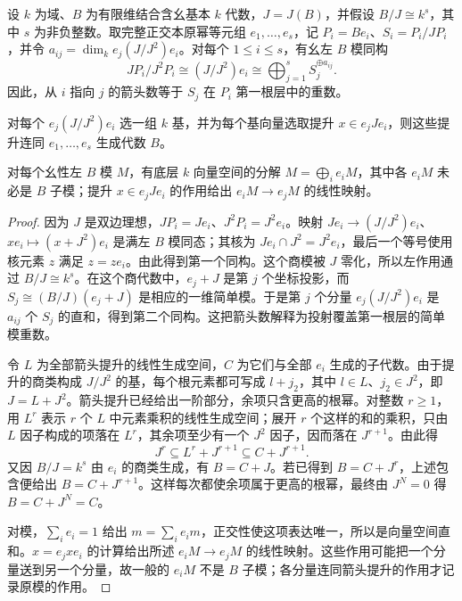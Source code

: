 \begin{proposition}\label{b2:prop:basic-algebra-arrow-generators}
	设 \(k\) 为域、\(B\) 为有限维结合含幺基本 \(k\) 代数，\(J=J(B)\)，并假设 \(B/J\cong k^s\)，其中 \(s\) 为非负整数。取完整正交本原幂等元组 \(e_1,\ldots,e_s\)，记 \(P_i=Be_i\)、\(S_i=P_i/JP_i\)，并令 \(a_{ij}=\dim_k e_j(J/J^2)e_i\)。对每个 \(1\le i\le s\)，有幺左 \(B\) 模同构
	\[
		JP_i/J^2P_i\cong(J/J^2)e_i \cong\bigoplus_{j=1}^s S_j^{\oplus a_{ij}}.
	\]
	因此，从 \(i\) 指向 \(j\) 的箭头数等于 \(S_j\) 在 \(P_i\) 第一根层中的重数。

	对每个 \(e_j(J/J^2)e_i\) 选一组 \(k\) 基，并为每个基向量选取提升 \(x\in e_jJe_i\)，则这些提升连同 \(e_1,\ldots,e_s\) 生成代数 \(B\)。

	对每个幺性左 \(B\) 模 \(M\)，有底层 \(k\) 向量空间的分解 \(M=\bigoplus_i e_iM\)，其中各 \(e_iM\) 未必是 \(B\) 子模；提升 \(x\in e_jJe_i\) 的作用给出 \(e_iM\to e_jM\) 的线性映射。
\end{proposition}
\begin{proof}
	因为 \(J\) 是双边理想，\(JP_i=Je_i\)、\(J^2P_i=J^2e_i\)。映射 \(Je_i\to(J/J^2)e_i\)、\(xe_i\mapsto(x+J^2)e_i\) 是满左 \(B\) 模同态；其核为 \(Je_i\cap J^2=J^2e_i\)，最后一个等号使用核元素 \(z\) 满足 \(z=ze_i\)。由此得到第一个同构。这个商模被 \(J\) 零化，所以左作用通过 \(B/J\cong k^s\)。在这个商代数中，\(e_j+J\) 是第 \(j\) 个坐标投影，而 \(S_j\cong(B/J)(e_j+J)\) 是相应的一维简单模。于是第 \(j\) 个分量 \(e_j(J/J^2)e_i\) 是 \(a_{ij}\) 个 \(S_j\) 的直和，得到第二个同构。这把箭头数解释为投射覆盖第一根层的简单模重数。

	令 \(L\) 为全部箭头提升的线性生成空间，\(C\) 为它们与全部 \(e_i\) 生成的子代数。由于提升的商类构成 \(J/J^2\) 的基，每个根元素都可写成 \(l+j_2\)，其中 \(l\in L\)、\(j_2\in J^2\)，即 \(J=L+J^2\)。箭头提升已经给出一阶部分，余项只含更高的根幂。对整数 \(r\ge1\)，用 \(L^r\) 表示 \(r\) 个 \(L\) 中元素乘积的线性生成空间；展开 \(r\) 个这样的和的乘积，只由 \(L\) 因子构成的项落在 \(L^r\)，其余项至少有一个 \(J^2\) 因子，因而落在 \(J^{r+1}\)。由此得
	\[
		J^r\subseteq L^r+J^{r+1}\subseteq C+J^{r+1}.
	\]
	又因 \(B/J=k^s\) 由 \(e_i\) 的商类生成，有 \(B=C+J\)。若已得到 \(B=C+J^r\)，上述包含便给出 \(B=C+J^{r+1}\)。这样每次都使余项属于更高的根幂，最终由 \(J^N=0\) 得 \(B=C+J^N=C\)。

	对模，\(\sum_i e_i=1\) 给出 \(m=\sum_i e_im\)，正交性使这项表达唯一，所以是向量空间直和。\(x=e_jxe_i\) 的计算给出所述 \(e_iM\to e_jM\) 的线性映射。这些作用可能把一个分量送到另一个分量，故一般的 \(e_iM\) 不是 \(B\) 子模；各分量连同箭头提升的作用才记录原模的作用。
\end{proof}

